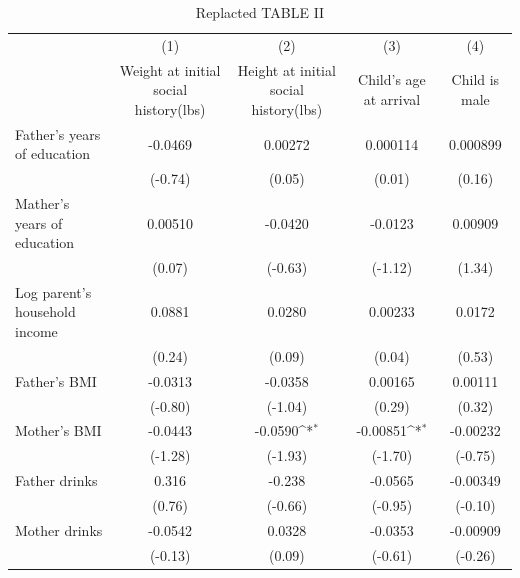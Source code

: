 \begin{table}[htbp]\centering
\def\sym#1{\ifmmode^{#1}\else\(^{#1}\)\fi}
\caption{Replacted TABLE II}
\begin{tabular}{l*{4}{c}}
\hline\hline
            &\multicolumn{1}{c}{(1)}&\multicolumn{1}{c}{(2)}&\multicolumn{1}{c}{(3)}&\multicolumn{1}{c}{(4)}\\
            &\multicolumn{1}{c}{Weight at initial social history(lbs)}&\multicolumn{1}{c}{Height at initial social history(lbs)}&\multicolumn{1}{c}{Child's age at arrival}&\multicolumn{1}{c}{Child is male}\\
\hline
Father's years of education&     -0.0469         &     0.00272         &    0.000114         &    0.000899         \\
            &     (-0.74)         &      (0.05)         &      (0.01)         &      (0.16)         \\
Mather's years of education&     0.00510         &     -0.0420         &     -0.0123         &     0.00909         \\
            &      (0.07)         &     (-0.63)         &     (-1.12)         &      (1.34)         \\
Log parent's household income&      0.0881         &      0.0280         &     0.00233         &      0.0172         \\
            &      (0.24)         &      (0.09)         &      (0.04)         &      (0.53)         \\
Father's BMI&     -0.0313         &     -0.0358         &     0.00165         &     0.00111         \\
            &     (-0.80)         &     (-1.04)         &      (0.29)         &      (0.32)         \\
Mother's BMI&     -0.0443         &     -0.0590\sym{*}  &    -0.00851\sym{*}  &    -0.00232         \\
            &     (-1.28)         &     (-1.93)         &     (-1.70)         &     (-0.75)         \\
Father drinks&       0.316         &      -0.238         &     -0.0565         &    -0.00349         \\
            &      (0.76)         &     (-0.66)         &     (-0.95)         &     (-0.10)         \\
Mother drinks&     -0.0542         &      0.0328         &     -0.0353         &    -0.00909         \\
            &     (-0.13)         &      (0.09)         &     (-0.61)         &     (-0.26)         \\

\end{tabular}
\end{table}
